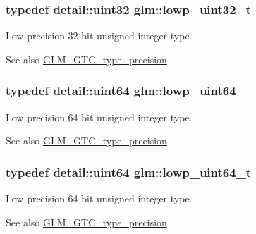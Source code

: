 \subsubsection[{\texorpdfstring{lowp\+\_\+uint32\+\_\+t}{lowp_uint32_t}}]{\setlength{\rightskip}{0pt plus 5cm}typedef detail\+::uint32 {\bf glm\+::lowp\+\_\+uint32\+\_\+t}}\hypertarget{group__gtc__type__precision_ga9f8cb602a358e1f48bda2682cf051f0c}{}\label{group__gtc__type__precision_ga9f8cb602a358e1f48bda2682cf051f0c}
Low precision 32 bit unsigned integer type. \begin{DoxySeeAlso}{See also}
\hyperlink{group__gtc__type__precision}{G\+L\+M\+\_\+\+G\+T\+C\+\_\+type\+\_\+precision} 
\end{DoxySeeAlso}
\subsubsection[{\texorpdfstring{lowp\+\_\+uint64}{lowp_uint64}}]{\setlength{\rightskip}{0pt plus 5cm}typedef detail\+::uint64 {\bf glm\+::lowp\+\_\+uint64}}\hypertarget{group__gtc__type__precision_gacf666a9d9b309c4615c7a4f2ab0be289}{}\label{group__gtc__type__precision_gacf666a9d9b309c4615c7a4f2ab0be289}
Low precision 64 bit unsigned integer type. \begin{DoxySeeAlso}{See also}
\hyperlink{group__gtc__type__precision}{G\+L\+M\+\_\+\+G\+T\+C\+\_\+type\+\_\+precision} 
\end{DoxySeeAlso}
\subsubsection[{\texorpdfstring{lowp\+\_\+uint64\+\_\+t}{lowp_uint64_t}}]{\setlength{\rightskip}{0pt plus 5cm}typedef detail\+::uint64 {\bf glm\+::lowp\+\_\+uint64\+\_\+t}}\hypertarget{group__gtc__type__precision_gabf3069d4f188557a87b1d7f35eb0a270}{}\label{group__gtc__type__precision_gabf3069d4f188557a87b1d7f35eb0a270}
Low precision 64 bit unsigned integer type. \begin{DoxySeeAlso}{See also}
\hyperlink{group__gtc__type__precision}{G\+L\+M\+\_\+\+G\+T\+C\+\_\+type\+\_\+precision} 
\end{DoxySeeAlso}
